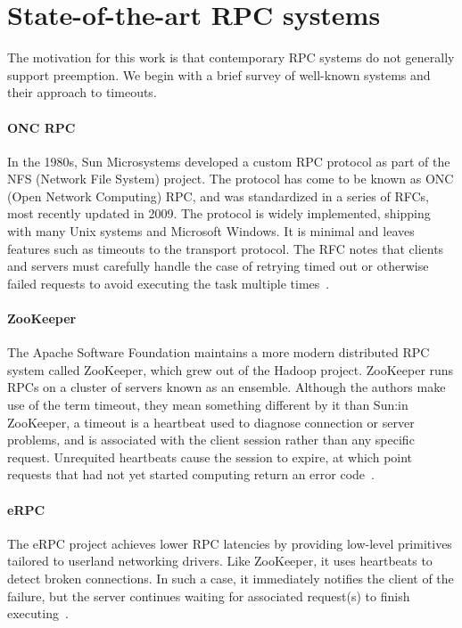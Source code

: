 \section{State-of-the-art RPC systems}

The motivation for this work is that contemporary RPC systems do not generally
support preemption.  We begin with a brief survey of well-known systems and their
approach to timeouts.

\paragraph{ONC RPC}
In the 1980s, Sun Microsystems developed a custom RPC protocol as part of the NFS
(Network File System) project.  The protocol has come to be known as ONC (Open
Network Computing) RPC, and was standardized in a series of RFCs, most recently
updated in 2009.  The protocol is widely implemented, shipping with many Unix systems
and Microsoft Windows.  It is minimal and leaves features such as timeouts to the
transport protocol.  The RFC notes that clients and servers must carefully handle the
case of retrying timed out or otherwise failed requests to avoid executing the task
multiple times~\cite{www-onc-rpc-rfc}.

\paragraph{ZooKeeper}
The Apache Software Foundation maintains a more modern distributed RPC system called
ZooKeeper, which grew out of the Hadoop project.  ZooKeeper runs RPCs on a cluster of
servers known as an ensemble.  Although the authors make use of the term timeout,
they mean something different by it than Sun:\@ in ZooKeeper, a timeout is a
heartbeat used to diagnose connection or server problems, and is associated with the
client session rather than any specific request.  Unrequited heartbeats cause the
session to expire, at which point requests that had not yet started computing return
an error code~\cite{Hunt:zookeeper:2010}.

\paragraph{eRPC}
The eRPC project achieves lower RPC latencies by providing low-level primitives
tailored to userland networking drivers.  Like ZooKeeper, it uses heartbeats to
detect broken connections.  In such a case, it immediately notifies the client of the
failure, but the server continues waiting for associated request(s) to finish
executing~\cite{Kalia:nsdi2019}.

